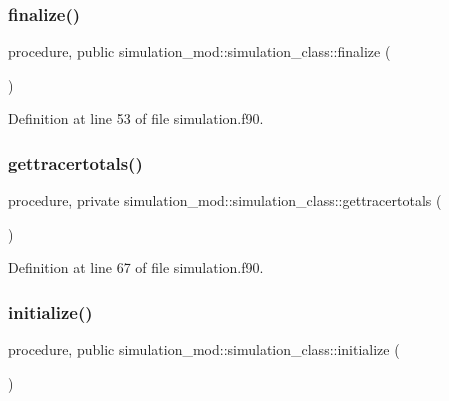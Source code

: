 \subsubsection{\texorpdfstring{finalize()}{finalize()}}
{\footnotesize\ttfamily procedure, public simulation\+\_\+mod\+::simulation\+\_\+class\+::finalize (\begin{DoxyParamCaption}{ }\end{DoxyParamCaption})}



Definition at line 53 of file simulation.\+f90.

\mbox{\label{structsimulation__mod_1_1simulation__class_ab22e46320d4a3dd0f2739894d1165a85}} 
\subsubsection{\texorpdfstring{gettracertotals()}{gettracertotals()}}
{\footnotesize\ttfamily procedure, private simulation\+\_\+mod\+::simulation\+\_\+class\+::gettracertotals (\begin{DoxyParamCaption}{ }\end{DoxyParamCaption})\hspace{0.3cm}{\ttfamily [private]}}



Definition at line 67 of file simulation.\+f90.

\mbox{\label{structsimulation__mod_1_1simulation__class_aa66177f314198046f3e05d9a0a322a22}} 
\subsubsection{\texorpdfstring{initialize()}{initialize()}}
{\footnotesize\ttfamily procedure, public simulation\+\_\+mod\+::simulation\+\_\+class\+::initialize (\begin{DoxyParamCaption}{ }\end{DoxyParamCaption})}



